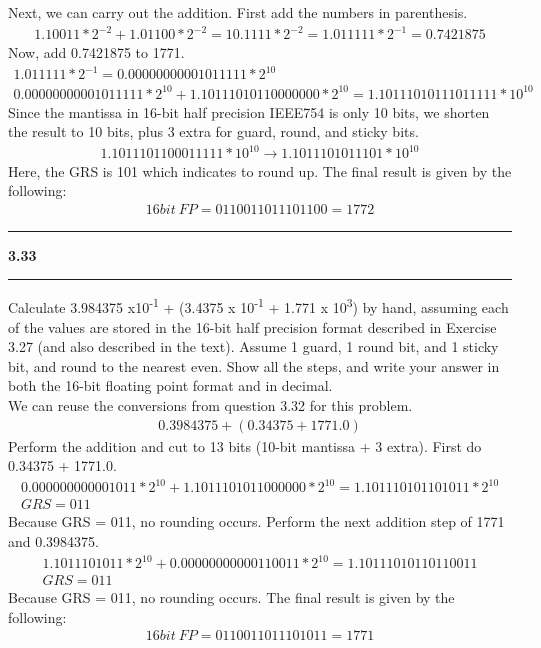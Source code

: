 \documentclass[11pt]{article}
\newcommand\question[2]{\vspace{.25in}\hrule\textbf{#1 #2}\vspace{.5em}\hrule\vspace{.10in}}
\begin{document}
Next, we can carry out the addition. First add the numbers in parenthesis.
\begin{gather*}
1.10011*2^{-2} + 1.01100*2^{-2} = 10.1111*2^{-2} = 1.011111*2^{-1} = 0.7421875
\end{gather*}
Now, add 0.7421875 to 1771.
\begin{gather*}
1.011111*2^{-1} = 0.00000000001011111*2^{10} \\
 0.00000000001011111*2^{10} + 1.10111010110000000*2^{10}  = 1.10111010111011111*10^{10}
\end{gather*}
Since the mantissa in 16-bit half precision IEEE754 is only 10 bits, we shorten the result to 10 bits, plus 3 extra for guard, round, and sticky bits.
\begin{gather*}
1.1011101100011111*10^{10} \rightarrow 1.1011101011101*10^{10}
\end{gather*}
Here, the GRS is 101 which indicates to round up.
The final result is given by the following:
\begin{gather*}
16bit \: FP = 0110011011101100 = 1772
\end{gather*}

\question{3.33}{} 
 Calculate  3.984375 x10\textsuperscript{-1} + (3.4375 x 10\textsuperscript{-1} + 1.771 x 10\textsuperscript{3}) by hand, assuming each of the values are stored in the 16-bit half precision format described in Exercise 3.27 (and also described in the  text). Assume 1 guard, 1 round bit, and 1 sticky bit, and round to the nearest even. Show all the steps, and  write your answer in both the 16-bit floating point format and in decimal.\\[1em]

We can reuse the conversions from question 3.32 for this problem.
\begin{gather*}
0.3984375 + (0.34375 + 1771.0)
\end{gather*}
Perform the addition and cut to 13 bits (10-bit mantissa + 3 extra). First do 0.34375 + 1771.0.
\begin{gather*}
0.000000000001011 * 2^{10} + 1.1011101011000000*2^{10} = 1.101110101101011 * 2^{10} \\
GRS = 011
\end{gather*}
Because GRS = 011, no rounding occurs. Perform the next addition step of 1771 and 0.3984375.
\begin{gather*}
1.1011101011 * 2^{10} + 0.00000000000110011 * 2^{10} = 1.10111010110110011 \\
GRS = 011
\end{gather*}
Because GRS = 011, no rounding occurs. The final result is given by the following:
\begin{gather*}
16bit \: FP = 0110011011101011 = 1771
\end{gather*}
\end{document}
